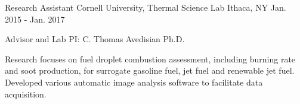 \begin{cventries}
  \cventry
    {Research Assistant} %
    {Cornell University, Thermal Science Lab} %
    {Ithaca, NY} %
    {Jan. 2015 - Jan. 2017} %
    {
      \begin{cvitems} %
        \item {Advisor and Lab PI: C. Thomas Avedisian Ph.D.}
        \item {Research focuses on fuel droplet combustion assessment, including burning rate and soot production, for surrogate gasoline fuel, jet fuel and renewable jet fuel. Developed various automatic image analysis software to facilitate data acquisition.}
      \end{cvitems}
    }

\end{cventries}
